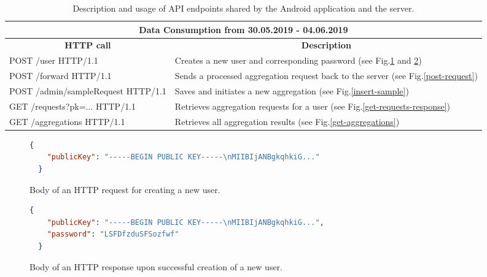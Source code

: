 \begin{table}[h]
  \begin{tabularx}{\textwidth}{|l|X|}
    \hline
    \multicolumn{2}{|c|}{\textbf{Data Consumption from 30.05.2019 - 04.06.2019}}                                                                              \\ \hline
     \multicolumn{1}{|c|}{\textbf{HTTP call}}                 & \multicolumn{1}{c|}{\textbf{Description}}                                                                               \\ \hline
    POST /user HTTP/1.1                & Creates a new user and corresponding password (see Fig.\ref{post-user-request} and \ref{post-user-response}) \\ \hline
    POST /forward HTTP/1.1             & Sends a processed aggregation request back to the server (see Fig.\ref{post-request})              \\ \hline
    POST /admin/sampleRequest HTTP/1.1 & Saves and initiates a new aggregation (see Fig.\ref{insert-sample})                                          \\ \hline
    GET /requests?pk=... HTTP/1.1      & Retrieves aggregation requests for a user (see Fig.\ref{get-requests-response})                    \\ \hline
    GET /aggregations HTTP/1.1         & Retrieves all aggregation results (see Fig.\ref{get-aggregations})                                 \\ \hline
  \end{tabularx}
  \caption{Description and usage of API endpoints shared by the Android application and the server.}
  \label{api-endpoints}
\end{table}

\begin{figure}[!h]
  \begin{lstlisting}[language=json,firstnumber=1]
  {
    "publicKey": "-----BEGIN PUBLIC KEY-----\nMIIBIjANBgkqhkiG..."
  }
  \end{lstlisting}
  \caption{Body of an HTTP request for creating a new user.}
  \label{post-user-request}
\end{figure}

\begin{figure}[h!]
  \begin{lstlisting}[language=json,firstnumber=1]
  {
    "publicKey": "-----BEGIN PUBLIC KEY-----\nMIIBIjANBgkqhkiG...",
    "password": "LSFDfzduSFSozfwf"
  }
  \end{lstlisting}
  \caption{Body of an HTTP response upon successful creation of a new user.}
  \label{post-user-response}
\end{figure}

